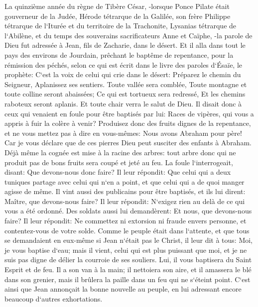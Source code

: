 \verse La quinzième année du règne de Tibère César, -lorsque Ponce Pilate était gouverneur de la Judée, Hérode tétrarque de la Galilée, son frère Philippe tétrarque de l`Iturée et du territoire de la Trachonite, Lysanias tétrarque de l`Abilène, 
\verse et du temps des souverains sacrificateurs Anne et Caïphe, -la parole de Dieu fut adressée à Jean, fils de Zacharie, dans le désert. 
\verse Et il alla dans tout le pays des environs de Jourdain, prêchant le baptême de repentance, pour la rémission des péchés, 
\verse selon ce qui est écrit dans le livre des paroles d`Ésaïe, le prophète: C`est la voix de celui qui crie dans le désert: Préparez le chemin du Seigneur, Aplanissez ses sentiers. 
\verse Toute vallée sera comblée, Toute montagne et toute colline seront abaissées; Ce qui est tortueux sera redressé, Et les chemins raboteux seront aplanis. 
\verse Et toute chair verra le salut de Dieu. 
\verse Il disait donc à ceux qui venaient en foule pour être baptisés par lui: Races de vipères, qui vous a appris à fuir la colère à venir? 
\verse Produisez donc des fruits dignes de la repentance, et ne vous mettez pas à dire en vous-mêmes: Nous avons Abraham pour père! Car je vous déclare que de ces pierres Dieu peut susciter des enfants à Abraham. 
\verse Déjà même la cognée est mise à la racine des arbres: tout arbre donc qui ne produit pas de bons fruits sera coupé et jeté au feu. 
\verse La foule l`interrogeait, disant: Que devons-nous donc faire? 
\verse Il leur répondit: Que celui qui a deux tuniques partage avec celui qui n`en a point, et que celui qui a de quoi manger agisse de même. 
\verse Il vint aussi des publicains pour être baptisés, et ils lui dirent: Maître, que devons-nous faire? 
\verse Il leur répondit: N`exigez rien au delà de ce qui vous a été ordonné. 
\verse Des soldats aussi lui demandèrent: Et nous, que devons-nous faire? Il leur répondit: Ne commettez ni extorsion ni fraude envers personne, et contentez-vous de votre solde. 
\verse Comme le peuple était dans l`attente, et que tous se demandaient en eux-même si Jean n`était pas le Christ, 
\verse il leur dit à tous: Moi, je vous baptise d`eau; mais il vient, celui qui est plus puissant que moi, et je ne suis pas digne de délier la courroie de ses souliers. Lui, il vous baptisera du Saint Esprit et de feu. 
\verse Il a son van à la main; il nettoiera son aire, et il amassera le blé dans son grenier, mais il brûlera la paille dans un feu qui ne s`éteint point. 
\verse C`est ainsi que Jean annonçait la bonne nouvelle au peuple, en lui adressant encore beaucoup d`autres exhortations. 
